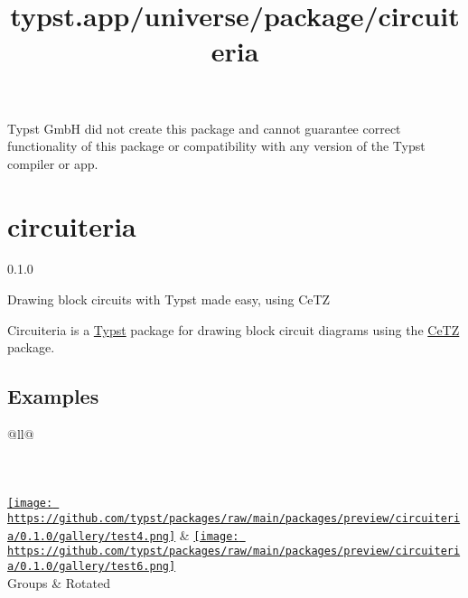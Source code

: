 Typst GmbH did not create this package and cannot guarantee correct
functionality of this package or compatibility with any version of the
Typst compiler or app.


\title{typst.app/universe/package/circuiteria}

\label{banner}
\section{circuiteria}\label{circuiteria}

{ 0.1.0 }

Drawing block circuits with Typst made easy, using CeTZ

\label{readme}
Circuiteria is a \href{https://typst.app/}{Typst} package for drawing
block circuit diagrams using the
\href{https://typst.app/universe/package/cetz}{CeTZ} package.


\subsection{Examples}\label{examples}

\begin{longtable}[]{@{}ll@{}}
\toprule\noalign{}
\endhead
\bottomrule\noalign{}
\endlastfoot
{} \\
 \\
 \\
 \\
\href{https://github.com/typst/packages/raw/main/packages/preview/circuiteria/0.1.0/gallery/test4.typ}{\texttt{[image: https://github.com/typst/packages/raw/main/packages/preview/circuiteria/0.1.0/gallery/test4.png]}}
&
\href{https://github.com/typst/packages/raw/main/packages/preview/circuiteria/0.1.0/gallery/test6.typ}{\texttt{[image: https://github.com/typst/packages/raw/main/packages/preview/circuiteria/0.1.0/gallery/test6.png]}} \\
Groups & Rotated \\
\end{longtable}

